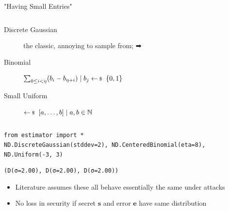 \documentclass[table,10pt,aspectratio=169]{beamer}
\renewcommand{\vec}[1]{\ensuremath{\mathbf{#1}}\xspace}
\begin{document}
\begin{frame}[label={sec:org719bcd7},fragile]{"Having Small Entries"}
 \begin{columns}
\begin{column}{0.5\columnwidth}
\begin{description}
\item[{Discrete Gaussian}] the classic, annoying to sample from; ➡
\item[{Binomial}] \(\sum_{0 \leq i < \eta} (b_{i} - b_{\eta+i}) \mid b_{j} \sample \bin\)
\item[{Small Uniform}] \(\sample [a,\ldots,b] \mid a,b \in \NN\)
\end{description}
\end{column}

\begin{column}{0.5\columnwidth}
\end{column}
\end{columns}

\lstset{language=Python,label= ,caption= ,captionpos=b,numbers=none}
\begin{lstlisting}
from estimator import *
ND.DiscreteGaussian(stddev=2), ND.CenteredBinomial(eta=8), ND.Uniform(-3, 3)
\end{lstlisting}

\begin{verbatim}
(D(σ=2.00), D(σ=2.00), D(σ=2.00))
\end{verbatim}


\begin{itemize}
\item Literature assumes these all behave essentially the same under attacks
\item No loss in security if secret \(\vec{s}\) and error \(\vec{e}\) have same distribution \cite{C:ACPS09}
\end{itemize}
\end{frame}
\end{document}
